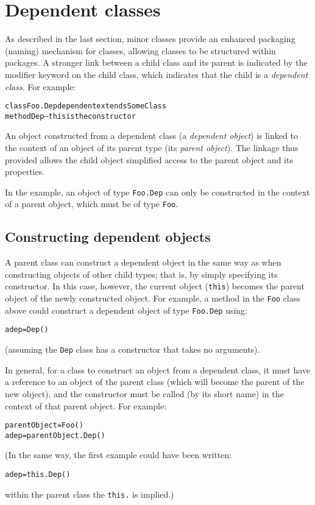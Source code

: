 \section{Dependent classes}\label{refsdepen}
\index{,}
\index{,}
\index{,}
 
As described in the last section, minor classes provide an enhanced
packaging (naming) mechanism for classes, allowing classes to be
structured within packages.  A stronger link between a child class and
its parent is indicated by the modifier keyword  on the
child class, which indicates that the child is a \emph{dependent class}.
For example:
\begin{alltt}
class Foo.Dep dependent extends SomeClass
  method Dep   -- this is the constructor
\end{alltt}
 
An object constructed from a dependent class (a \emph{dependent
object}) is linked to the context of an object of its parent
type (its \emph{parent object}).
The linkage thus provided allows the child object simplified access to
the parent object and its properties.
 
In the example, an object of type \texttt{Foo.Dep} can only be constructed
in the context of a parent object, which must be of type \texttt{Foo}.
\subsection{Constructing dependent objects}
 
A parent class can construct a dependent object in the same way as when
constructing objects of other child types; that is, by simply specifying
its constructor.  In this case, however, the current object
(\texttt{this}) becomes the parent object of the newly constructed object.
For example, a method in the \texttt{Foo} class above could construct a
dependent object of type \texttt{Foo.Dep} using:
\begin{alltt}
adep=Dep()
\end{alltt}
(assuming the \texttt{Dep} class has a constructor that takes no
arguments).
 
In general, for a class to construct an object from a dependent class,
it must have a reference to an object of the parent class (which will
become the parent of the new object), and the constructor must be called
(by its short name) in the context of that parent object.  For example:
\begin{alltt}
parentObject=Foo()
adep=parentObject.Dep()
\end{alltt}
(In the same way, the first example could have been written:
\begin{alltt}
adep=this.Dep()
\end{alltt}
within the parent class the \texttt{this.} is implied.)
 
